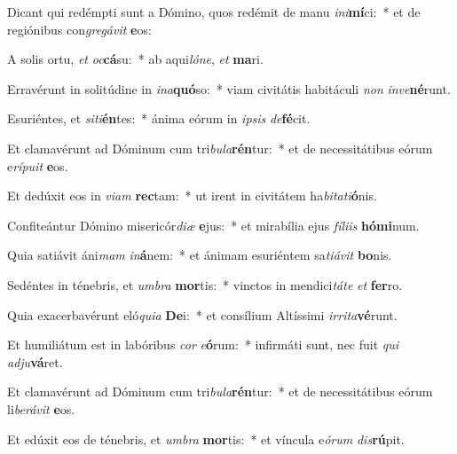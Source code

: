 \item Dicant qui redémpti sunt a Dómino, quos redémit de manu \textit{in}\textit{i}\textbf{mí}ci:~* et de regiónibus con\textit{gre}\textit{gá}\textit{vit} \textbf{e}os:
\item A solis ortu, \textit{et} \textit{oc}\textbf{cá}su:~* ab aqui\textit{ló}\textit{ne}, \textit{et} \textbf{ma}ri.
\item Erravérunt in solitúdine in \textit{in}\textit{a}\textbf{quó}so:~* viam civitátis habitáculi \textit{non} \textit{in}\textit{ve}\textbf{né}runt.
\item Esuriéntes, et \textit{si}\textit{ti}\textbf{én}tes:~* ánima eórum in \textit{ip}\textit{sis} \textit{de}\textbf{fé}cit.
\item Et clamavérunt ad Dóminum cum tri\textit{bu}\textit{la}\textbf{rén}tur:~* et de necessitátibus eórum e\textit{rí}\textit{pu}\textit{it} \textbf{e}os.
\item Et dedúxit eos in \textit{vi}\textit{am} \textbf{rec}tam:~* ut irent in civitátem ha\textit{bi}\textit{ta}\textit{ti}\textbf{ó}nis.
\item Confiteántur Dómino misericór\textit{di}\textit{æ} \textbf{e}jus:~* et mirabília ejus \textit{fí}\textit{li}\textit{is} \textbf{hó}\textbf{mi}num.
\item Quia satiávit áni\textit{mam} \textit{in}\textbf{á}nem:~* et ánimam esuriéntem sa\textit{ti}\textit{á}\textit{vit} \textbf{bo}nis.
\item Sedéntes in ténebris, et \textit{um}\textit{bra} \textbf{mor}tis:~* vinctos in mendici\textit{tá}\textit{te} \textit{et} \textbf{fer}ro.
\item Quia exacerbavérunt eló\textit{qui}\textit{a} \textbf{De}i:~* et consílium Altíssimi \textit{ir}\textit{ri}\textit{ta}\textbf{vé}runt.
\item Et humiliátum est in labóribus \textit{cor} \textit{e}\textbf{ó}rum:~* infirmáti sunt, nec fuit \textit{qui} \textit{ad}\textit{ju}\textbf{vá}ret.
\item Et clamavérunt ad Dóminum cum tri\textit{bu}\textit{la}\textbf{rén}tur:~* et de necessitátibus eórum li\textit{be}\textit{rá}\textit{vit} \textbf{e}os.
\item Et edúxit eos de ténebris, et \textit{um}\textit{bra} \textbf{mor}tis:~* et víncula e\textit{ó}\textit{rum} \textit{dis}\textbf{rú}pit.
